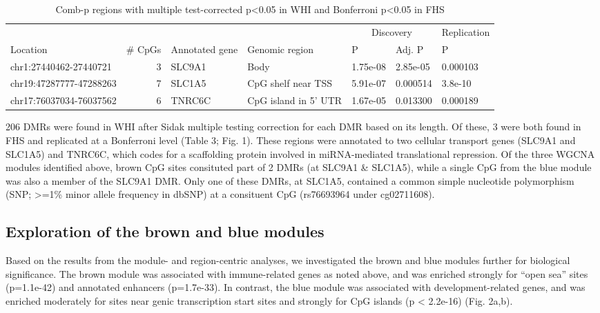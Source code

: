 \documentclass[]{article}
\theoremstyle{definition}
\theoremstyle{definition}
\theoremstyle{definition}
\theoremstyle{remark}
\begin{document}
\begin{table}

\caption{\label{tab:combp-results}Comb-p regions with multiple test-corrected p<0.05 in WHI and Bonferroni p<0.05 in FHS}
\centering
\begin{tabular}[t]{lrlllll}
\toprule
\multicolumn{1}{c}{} & \multicolumn{1}{c}{} & \multicolumn{1}{c}{} & \multicolumn{1}{c}{} & \multicolumn{2}{c}{Discovery} & \multicolumn{1}{c}{Replication} \\
\cmidrule(l{2pt}r{2pt}){5-6} \cmidrule(l{2pt}r{2pt}){7-7}
Location & \# CpGs & Annotated gene & Genomic region & P & Adj. P & P\\
\midrule
chr1:27440462-27440721 & 3 & SLC9A1 & Body & 1.75e-08 & 2.85e-05 & 0.000103\\
chr19:47287777-47288263 & 7 & SLC1A5 & CpG shelf near TSS & 5.91e-07 & 0.000514 & 3.8e-10\\
chr17:76037034-76037562 & 6 & TNRC6C & CpG island in 5' UTR & 1.67e-05 & 0.013300 & 0.000189\\
\bottomrule
\end{tabular}
\end{table}

206 DMRs were found in WHI after Sidak multiple testing correction for
each DMR based on its length. Of these, 3 were both found in FHS and
replicated at a Bonferroni level (Table 3; Fig. 1). These regions were
annotated to two cellular transport genes (SLC9A1 and SLC1A5) and
TNRC6C, which codes for a scaffolding protein involved in miRNA-mediated
translational repression. Of the three WGCNA modules identified above,
brown CpG sites consituted part of 2 DMRs (at SLC9A1 \& SLC1A5), while
a single CpG from the blue module was also a member of the SLC9A1 DMR.
Only one of these DMRs, at SLC1A5, contained a common simple nucleotide
polymorphism (SNP; \textgreater{}=1\% minor allele frequency in dbSNP)
at a consituent CpG (rs76693964 under cg02711608).

\subsection{Exploration of the brown and blue
modules}\label{exploration-of-the-brown-and-blue-modules}

Based on the results from the module- and region-centric analyses, we
investigated the brown and blue modules further for biological
significance. The brown module was associated with immune-related genes
as noted above, and was enriched strongly for ``open sea'' sites
(p=1.1e-42) and annotated enhancers (p=1.7e-33). In contrast, the blue
module was associated with development-related genes, and was enriched
moderately for sites near genic transcription start sites and strongly
for CpG islands (p \textless{} 2.2e-16) (Fig. 2a,b).
\end{document}

